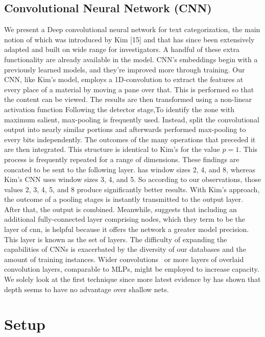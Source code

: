 \documentclass[a4paper]{article}
\begin{document}
\subsection{Convolutional Neural Network (CNN)}
We present a Deep convolutional neural network for text categorization, the main notion of which was introduced by Kim [15] and that has since been extensively adapted and built on wide range for investigators. A handful of these extra functionality are already available in the model. CNN's embeddings begin with a previously learned models, and they're improved more through training. Our CNN, like Kim's model, employs a 1D-convolution to extract the features at every place of a material by moving a pane over that. This is performed so that the content can be viewed. The results are then transformed using a non-linear activation function Following the detector stage,To identify the zone with maximum salient, max-pooling is frequently used. Instead, \cite{liu2012internet} split the convolutional output into nearly similar portions and afterwards performed max-pooling to every bits independently. The outcomes of the many operations that preceded it are then integrated. This structure is identical to Kim's for the value $p=1$. This process is frequently repeated for a range of dimensions. These findings are concated to be sent to the following layer. \cite{liu2012internet} has window sizes 2, 4, and 8, whereas Kim's CNN uses window sizes 3, 4, and 5. So according to our observations, those values 2, 3, 4, 5, and 8 produce significantly better results. With Kim's approach, the outcome of a pooling stages is instantly transmitted to the output layer. After that, the output is combined.
Meanwhile, \cite{liu2012internet} suggests that including an additional fully-connected layer comprising nodes, which they term to be the layer of cnn, is helpful because it offers the network a greater model precision. This layer is known as the set of layers. The difficulty of expanding the capabilities of CNNs is exacerbated by the diversity of our databases and the amount of training instances. Wider convolutions  or more layers of overlaid convolution layers, comparable to MLPs, might be employed to increase capacity. We solely look at the first technique since more latest evidence by \cite{lewis04} has shown that depth seems to have no advantage over shallow nets.

\section{Setup}
\end{document}
